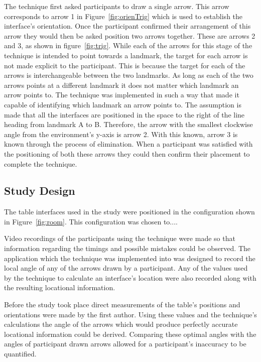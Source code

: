 \documentclass{bmcart}
\begin{document}
The technique first asked participants to draw a single arrow.
This arrow corresponds to arrow 1 in Figure~\ref{fig:orienTrig} which is used to establish the interface's orientation.
Once the participant confirmed their arrangement of this arrow they would then be asked position two arrows together.
These are arrows 2 and 3, as shown in figure~\ref{fig:trig}.
While each of the arrows for this stage of the technique is intended to point towards a landmark, the target for each arrow is not made explicit to the participant.
This is because the target for each of the arrows is interchangeable between the two landmarks.
As long as each of the two arrows points at a different landmark it does not matter which landmark an arrow points to.
The technique was implemented in such a way that made it capable of identifying which landmark an arrow points to.
The assumption is made that all the interfaces are positioned in the space to the right of the line heading from landmark A to B.
Therefore, the arrow with the smallest clockwise angle from the environment's y-axis is arrow 2.
With this known, arrow 3 is known through the process of elimination.
When a participant was satisfied with the positioning of both these arrows they could then confirm their placement to complete the technique.

\subsection*{Study Design}\label{sec:design}


The table interfaces used in the study were positioned in the configuration shown in Figure~\ref{fig:room}.
This configuration was chosen to....

Video recordings of the participants using the technique were made so that information regarding the timings and possible mistakes could be observed.
The application which the technique was implemented into was designed to record the local angle of any of the arrows drawn by a participant.
Any of the values used by the technique to calculate an interface's location were also recorded along with the resulting locational information.

Before the study took place direct measurements of the table's positions and orientations were made by the first author.
Using these values and the technique's calculations the angle of the arrows which would produce perfectly accurate locational information could be derived.
Comparing these optimal angles with the angles of participant drawn arrows allowed for a participant's inaccuracy to be quantified.
\end{document}
